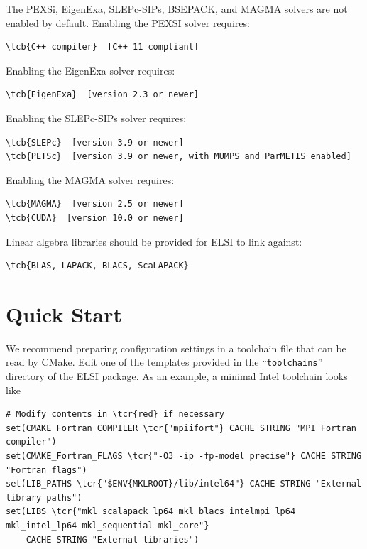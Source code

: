 \documentclass{report}
\newcommand{\tcb}[1]{\textcolor{blue}{#1}}
\newcommand{\tcr}[1]{\textcolor{red}{#1}}
\begin{document}
The PEXSi, EigenExa, SLEPc-SIPs, BSEPACK, and MAGMA solvers are not enabled by default. Enabling the PEXSI solver requires:
\begin{Verbatim}[commandchars=\\\{\}]
\tcb{C++ compiler}  [C++ 11 compliant]
\end{Verbatim}

Enabling the EigenExa solver requires:
\begin{Verbatim}[commandchars=\\\{\}]
\tcb{EigenExa}  [version 2.3 or newer]
\end{Verbatim}

Enabling the SLEPc-SIPs solver requires:
\begin{Verbatim}[commandchars=\\\{\}]
\tcb{SLEPc}  [version 3.9 or newer]
\tcb{PETSc}  [version 3.9 or newer, with MUMPS and ParMETIS enabled]
\end{Verbatim}

Enabling the MAGMA solver requires:
\begin{Verbatim}[commandchars=\\\{\}]
\tcb{MAGMA}  [version 2.5 or newer]
\tcb{CUDA}  [version 10.0 or newer]
\end{Verbatim}

Linear algebra libraries should be provided for ELSI to link against:
\begin{Verbatim}[commandchars=\\\{\}]
\tcb{BLAS, LAPACK, BLACS, ScaLAPACK}
\end{Verbatim}

\section{Quick Start}
\label{sec:quick}
We recommend preparing configuration settings in a toolchain file that can be read by CMake. Edit one of the templates provided in the ``\texttt{toolchains}'' directory of the ELSI package. As an example, a minimal Intel toolchain looks like
\begin{tcolorbox}
\begin{Verbatim}[commandchars=\\\{\}]
# Modify contents in \tcr{red} if necessary
set(CMAKE_Fortran_COMPILER \tcr{"mpiifort"} CACHE STRING "MPI Fortran compiler")
set(CMAKE_Fortran_FLAGS \tcr{"-O3 -ip -fp-model precise"} CACHE STRING "Fortran flags")
set(LIB_PATHS \tcr{"$ENV{MKLROOT}/lib/intel64"} CACHE STRING "External library paths")
set(LIBS \tcr{"mkl_scalapack_lp64 mkl_blacs_intelmpi_lp64 mkl_intel_lp64 mkl_sequential mkl_core"}
    CACHE STRING "External libraries")
\end{Verbatim}
\end{tcolorbox}
\end{document}
